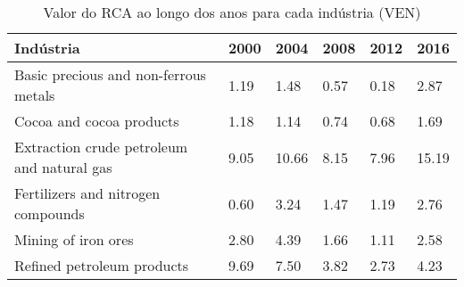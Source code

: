 \begin{table}
\centering
\caption{Valor do RCA ao longo dos anos para cada indústria (VEN)}
\label{tab:ex3-tempo-VEN}
\begin{tabular}{p{6cm}p{1.5cm}p{1.5cm}p{1.5cm}p{1.5cm}p{1.5cm}}
\toprule
                                 Indústria & 2000 &  2004 & 2008 & 2012 &  2016 \\
\midrule
     Basic precious and non-ferrous metals & 1.19 &  1.48 & 0.57 & 0.18 &  2.87 \\
                  Cocoa and cocoa products & 1.18 &  1.14 & 0.74 & 0.68 &  1.69 \\
Extraction crude petroleum and natural gas & 9.05 & 10.66 & 8.15 & 7.96 & 15.19 \\
        Fertilizers and nitrogen compounds & 0.60 &  3.24 & 1.47 & 1.19 &  2.76 \\
                       Mining of iron ores & 2.80 &  4.39 & 1.66 & 1.11 &  2.58 \\
                Refined petroleum products & 9.69 &  7.50 & 3.82 & 2.73 &  4.23 \\
\bottomrule
\end{tabular}
\end{table}
